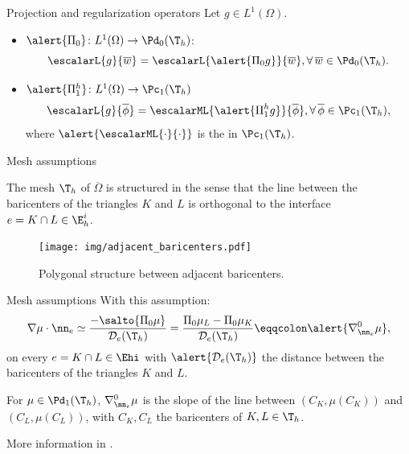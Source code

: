 \begin{frame}{Projection and regularization operators}
	Let $g\in L^1(\Omega)$.
	\vspace*{0.3cm}

	\begin{itemize}
		\item {} $\alert{\Pi_0}\colon L^1(\Omega) \rightarrow \Pd_0(\T_h)$:
		\begin{equation*}
			\escalarL{g}{\overline{w}}=
			\escalarL{\alert{\Pi_0 g}}{\overline{w}},\forall\,\overline{w}\in \Pd_0(\T_h).
		\end{equation*}
		\vspace*{0.1cm}
		\item {} $\alert{\Pi^h_1}\colon L^1(\Omega)\rightarrow \Pc_1(\T_h)$
		\begin{equation*}
			\escalarL{g}{\overline{\phi}}=\escalarML{\alert{\Pi^h_1 g}}{\overline{\phi}},\forall\,\overline{\phi}\in \Pc_1(\T_h),
		\end{equation*}
		where $\alert{\escalarML{\cdot}{\cdot}}$ is the  in $\Pc_1(\T_h)$.
	\end{itemize}
\end{frame}

\begin{frame}{Mesh assumptions}
	\begin{hypothesis}
		\label{hyp:mesh_n}
		The mesh $\T_h$ of $\overline\Omega$ is structured in the sense that the line between the baricenters of the triangles $K$ and $L$ is orthogonal to the interface $e=K\cap L\in\E_h^i$.
	\end{hypothesis}
	\vspace*{0.5cm}
	\begin{figure}
		\centering
		\texttt{[image: img/adjacent\_baricenters.pdf]}
		\caption{Polygonal structure between adjacent baricenters.}
	\end{figure}
\end{frame}
\begin{frame}{Mesh assumptions}
	With this assumption:
	$$\nabla\mu \cdot \nn_e \simeq\frac{-\salto{\Pi_0\mu}}{\mathcal{D}_e(\T_h)}= \frac{\Pi_0\mu_L-\Pi_0\mu_K}{\mathcal{D}_e(\T_h)}\eqqcolon \alert{\nabla_{\nn_e}^0\mu},$$
	on every $e=K\cap L\in\Ehi$ with $\alert{\mathcal{D}_e(\T_h)}$ the distance between the baricenters of the triangles $K$ and $L$.

	\vspace*{0.3cm}
	\begin{block}{}
		For $\mu\in\Pd_1(\T_h)$, $\nabla_{\nn_e}^0\mu$ is the slope of the line between $(C_K, \mu(C_K))$ and $(C_L, \mu(C_L))$, with $C_K, C_L$ the baricenters of $K, L\in\T_h$.
	\end{block}
	\vspace*{0.3cm}
	More information in \cite{acosta-soba_KS_2022}.
\end{frame}

